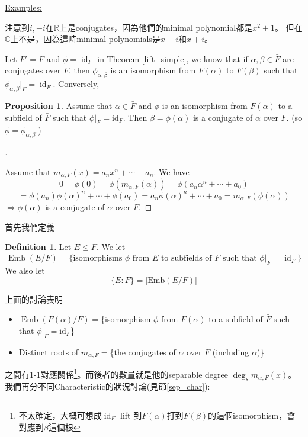 \documentclass[12pt]{article}
\theoremstyle{definition}
\newcommand{\ex}{\noindent\underline{Examples:}}
\newtheorem{dfn}{Definition}
\newtheorem{prop}{Proposition}
\newenvironment{proofs}[1][\proofname]{%
  \begin{proof}[#1]$ $\par\nobreak\ignorespaces
}{%
  \end{proof}
}
\newcommand{\CC}{\mathbb C}
\newcommand{\RR}{\mathbb R}
\DeclareMathOperator{\id}{id}
\DeclareMathOperator{\Emb}{Emb}
\begin{document}
\ex

注意到$i,-i$在$\RR$上是conjugates，因為他們的minimal polynomial都是$x^2+1$。
但在$\CC$上不是，因為這時minimal polynomials是$x-i$和$x+i$。


Let $F'=F$ and $\phi=\id_F$ in Theorem \ref{lift_simple}, we know that if $\alpha,\beta\in \bar{F}$ are conjugates over $F$, then $\phi_{\alpha,\beta}$ is an isomorphism from $F(\alpha)$ to $F(\beta)$ such that $\phi_{\alpha,\beta}|_F=\id_F$.
Conversely,

\begin{prop}
	Assume that $\alpha \in \bar{F}$ and $\phi$ is an isomorphism from $F(\alpha)$ to a subfield of $\bar{F}$ such that $\phi|_F = \text{id}_F$.
	Then $\beta=\phi(\alpha)$ is a conjugate of $\alpha$ over $F$. (so $\phi = \phi_{\alpha, \beta}$.)
\end{prop}

\begin{proofs}
	Assume that $m_{\alpha, F}(x) = a_n x^n + \cdots + a_n$.
	We have
	\[
		0 = \phi(0) = \phi(m_{\alpha, F}(\alpha)) = \phi(a_n \alpha^n + \cdots + a_0)
	\]
	\[
		= \phi(a_n) \phi(\alpha)^n + \cdots + \phi(a_0) = a_n \phi(\alpha)^n + \cdots + a_0 = m_{\alpha, F}(\phi(\alpha))
	\]
	$\Rightarrow \phi(\alpha)$ is a conjugate of $\alpha$ over $F$.

\end{proofs}

首先我們定義
\begin{dfn}
	Let $E \leq \bar{F}$. We let
	\[
		\Emb(E/F) =\{
		\text{isomorphisms $\phi$ from $E$ to subfields of $\bar{F}$ such that $\phi|_F = \id_F$}
		\}
	\]
	We also let
	\[\{E:F\} = |\text{Emb}(E/F)|\]
\end{dfn}


上面的討論表明
\begin{itemize}
	\item $\Emb(F(\alpha)/F)=$\{isomorphism $\phi$ from $F(\alpha)$ to a subfield of $\bar{F}$ such that $\phi|_F = \text{id}_F$\}
	\item Distinct roots of $m_{\alpha,F}=$\{the conjugates of $\alpha$ over $F$ (including $\alpha$)\}
\end{itemize}
之間有1-1對應關係\footnote{不太確定，大概可想成$\id_F$ lift 到$F(\alpha)$打到$F(\beta)$的這個isomorphism，會對應到$\beta$這個根}。而後者的數量就是他的separable degree $\deg_s m_{\alpha, F}(x)$。我們再分不同Characteristic的狀況討論(見節\ref{sep_char}):
\end{document}
